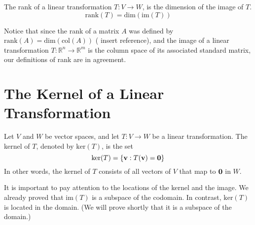 \documentclass{ximera}
\renewcommand{\vec}[1]{{\bf #1}}
\newcommand{\RR}{\mathbb{R}}
\begin{document}
\begin{definition}\label{def:rankofT}
The rank of a linear transformation $T:V\rightarrow W$, is the dimension of the image of $T$.
$$\text{rank}(T)=\text{dim}(\text{im}(T))$$
\end{definition}

Notice that since the rank of a matrix $A$ was defined by $\text{rank}(A) = \text{dim}(\text{col}(A))$ ({\color{red} insert reference}), and the image of a linear transformation $T:\RR^n\rightarrow \RR^m$ is the column space of its associated standard matrix, our definitions of rank are in agreement.

\section*{The Kernel of a Linear Transformation}

\begin{definition}
Let $V$ and $W$ be vector spaces, and let $T:V\rightarrow W$ be a linear transformation.  The kernel of $T$, denoted by $\text{ker}(T)$, is the set
$$\text{ker}(T)=\{\vec{v}:T(\vec{v})=\vec{0}\}$$
In other words, the kernel of $T$ consists of all vectors of $V$ that map to $\vec{0}$ in $W$.
\end{definition}
It is important to pay attention to the locations of the kernel and the image.  We already proved that $\text{im}(T)$ is a subspace of the codomain.  In contrast, $\text{ker}(T)$ is located in the domain.  (We will prove shortly that it is a subspace of the domain.)

\begin{center}
\end{center}
\end{document}
